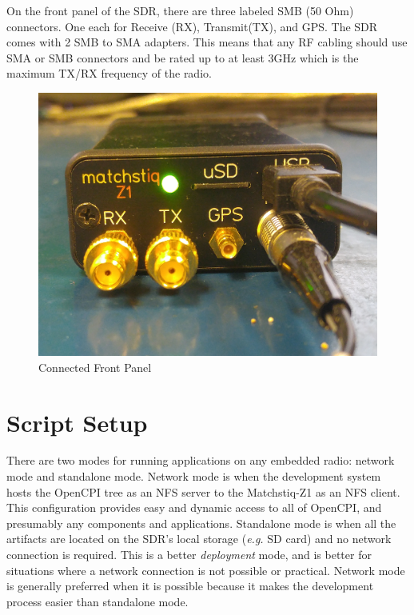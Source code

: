 \begin{flushleft}
On the front panel of the SDR, there are three labeled SMB (50 Ohm) connectors. One each for Receive (RX), Transmit(TX), and GPS.  The SDR comes with 2 SMB to SMA adapters.  This means that any RF cabling should use SMA or SMB connectors and be rated up to at least 3GHz which is the maximum TX/RX frequency of the radio. \\   \bigskip
\begin{figure}[ht]
	\centerline{\includegraphics[scale=0.1]{Matchstiq_Z1_frontpannel}}
	\caption{Connected Front Panel}
	\label{fig:front}
\end{figure}
\end{flushleft}

\section{Script Setup}
There are two modes for running applications on any embedded radio: network mode and standalone mode.  Network mode is when the development system hosts the OpenCPI tree as an NFS server to the Matchstiq-Z1 as an NFS client.  This configuration provides easy and dynamic access to all of OpenCPI, and presumably any components and applications.  Standalone mode is when all the artifacts are located on the SDR's local storage (\textit{e.g.} SD card) and no network connection is required.  This is a better \textit{deployment} mode, and is better for situations where a network connection is not possible or practical.  Network mode is generally preferred when it is possible because it makes the development process easier than standalone mode.

